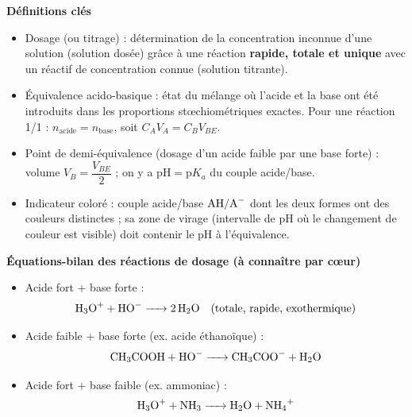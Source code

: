 \documentclass[11pt]{article}
\newcommand{\cle}[1]{{\popxbold\color{popdark}#1}}
\begin{document}
\begin{aretenir}
\textbf{Définitions clés}
\begin{itemize}
\item \cle{Dosage} (ou titrage) : détermination de la concentration inconnue d'une solution (\cle{solution dosée}) grâce à une réaction \textbf{rapide, totale et unique} avec un réactif de concentration connue (\cle{solution titrante}).
\item \cle{Équivalence acido-basique} : état du mélange où l'acide et la base ont été introduits dans les proportions stœchiométriques exactes. Pour une réaction 1/1 : $n_{\text{acide}} = n_{\text{base}}$, soit $C_A V_A = C_B V_{BE}$.
\item \cle{Point de demi-équivalence} (dosage d'un acide faible par une base forte) : volume $V_B = \dfrac{V_{BE}}{2}$ ; on y a $\mathrm{pH} = \mathrm{p}K_a$ du couple acide/base.
\item \cle{Indicateur coloré} : couple acide/base $\ce{AH}/\ce{A-}$ dont les deux formes ont des couleurs distinctes ; sa \cle{zone de virage} (intervalle de pH où le changement de couleur est visible) doit contenir le $\mathrm{pH}$ à l'équivalence.
\end{itemize}

\textbf{Équations-bilan des réactions de dosage (à connaître par c\oe ur)}
\begin{itemize}
\item Acide fort + base forte : \[ \ce{H3O+ + HO- -> 2 H2O} \quad \text{(totale, rapide, exothermique)} \]
\item Acide faible + base forte (ex. acide éthanoïque) : \[ \ce{CH3COOH + HO- -> CH3COO- + H2O} \]
\item Acide fort + base faible (ex. ammoniac) : \[ \ce{H3O+ + NH3 -> H2O + NH4+} \]
\end{itemize}


\end{aretenir}
\end{document}
